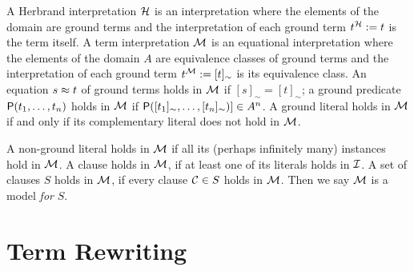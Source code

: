 \begin{definition}\label{def:termmodel}
	A {\myem Herbrand interpretation}  ${\mathcal H}$ is an interpretation where the elements of the domain are ground terms
	and the interpretation of each ground term $t^{\mathcal H} := t$ is the term itself.
	A {\myem term interpretation} ${\mathcal M}$ is an equational interpretation where the elements of the domain $A$ 
	are equivalence classes of ground terms
	and the interpretation of each ground term $t^{\mathcal M} := [t]_\sim$ is its equivalence class.
	An equation $s\approx t$ of ground terms holds in ${\mathcal M}$ if $[s]_\sim=[t]_\sim$;
	a ground predicate ${\mathsf P}(t_1,\ldots,t_n)$ holds in ${\mathcal M}$ if ${\mathsf P}([t_1]_\sim,\ldots,[t_n]_\sim)] \in A^n$.
	A ground literal holds in ${\mathcal M}$ if and only if its complementary literal does not hold in ${\mathcal M}$.
	
	A non-ground literal holds in ${\mathcal M}$ if all its 
	(perhaps infinitely many)
	instances hold in ${\mathcal M}$.
	A clause holds in ${\mathcal M}$, if at least one of its literals holds in ${\mathcal I}$.
	A set of clauses $S$ holds in ${\mathcal M}$, if every clause ${\mathcal C}\in S$ holds in ${\mathcal M}$.
	Then we say ${\mathcal M}$ is a model {\em for} $S$.
	
\end{definition}

\section{Term Rewriting}

